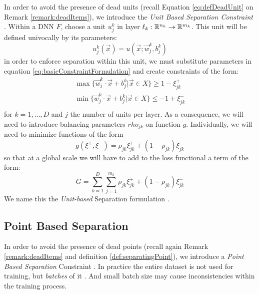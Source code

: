 In order to avoid the presence of dead units (recall Equation \ref{eq:defDeadUnit} on Remark \ref{remark:deadItems}), we introduce the \emph{Unit Based Separation Constraint} \SepUnit. Within a \ReLU DNN $F$, choose a unit $u_j^k$ in layer $\ell_k:\mathbb{R}^{n_k}\rightarrow\mathbb{R}^{m_k}$. This unit will be defined univocally by its parameters:
\begin{equation}\label{eq:unitSepParameterWriting}
    u^k_j(\vec{x}) = u(\vec{x};\vec{w}^k_j,b^k_j)
\end{equation}
in order to enforce separation within this unit, we must substitute parameters in equation \ref{eq:basicConstraintFormulation} and create constraints of the form:
\begin{equation}
    \begin{array}{lcl}
    \max\{\vec{w}^k_j\cdot\vec{x}+b^k_j|\vec{x}\in X\}\geq 1-\xi^{+}_{jk}\\
    \min\{\vec{w}^k_j\cdot\vec{x}+b^k_j|\vec{x}\in X\}\leq -1+\xi^{-}_{jk}\\
\end{array}
\end{equation}
for $k=1,\ldots,D$ and $j$ the number of units per layer. As a consequence, we will need to introduce balancing parameters $rho_{jk}$ on function $g$. Individually, we will need to minimize functions of the form
\begin{equation}
    g(\xi^{+},\xi^{-}) = \rho_{jk}\xi^{+}_{jk}+(1-\rho_{jk})\xi^{-}_{jk}
\end{equation}
so that at a global scale we will have to add to the loss functional a term of the form:
\begin{equation}\label{eq:constraintLossForUnitSeparation}
    G = \sum_{k=1}^{D}\sum_{j=1}^{m_k}\rho_{jk}\xi^{+}_{jk}+(1-\rho_{jk})\xi^{-}_{jk}
\end{equation}
We name this the \emph{Unit-based} Separation formulation \SepUnit. 

\subsection{Point Based Separation \SepPoint}\label{subsec:sepPoint}

In order to avoid the presence of dead points (recall again Remark \ref{remark:deadItems} and definition \ref{def:separatingPoint}), we introduce a \emph{Point Based Separation} Constraint \SepPoint. In practice the entire dataset is not used for training, but \emph{batches} of it \cite{LeCun06atutorial}. And small batch size may cause inconsistencies within the training process.

